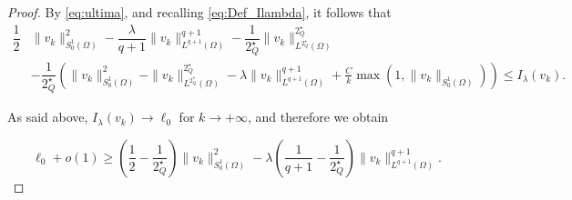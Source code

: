 \documentclass[11pt]{amsart}
\numberwithin{equation}{section} %
\theoremstyle{definition}
\newcommand{\m}{\mbox}
\begin{document}
\begin{proof}
\noindent By \eqref{eq:ultima}, and recalling \eqref{eq:Def_Ilambda}, it follows that
\begin{equation*}
	\begin{aligned}
	\dfrac{1}{2}&\| v_k\|^2_{{S_0^1(\Omega)}} - \dfrac{\lambda}{q+1}\|v_k\|^{q+1}_{L^{q+1}(\Omega)} - \dfrac{1}{2^\star_Q}\|v_k\|^{2^\star_Q}_{L^{2^\star_Q}(\Omega)} \\
	&-\dfrac{1}{2^{\star}_{Q}}\left(\| v_k\|^2_{{S_0^1(\Omega)}}-\|v_k\|^{2^\star_Q}_{L^{2^\star_Q}(\Omega)}-\lambda \|v_k\|^{q+1}_{L^{q+1}(\Omega)} +\frac{C}{k}\max(1,\|v_k\|_{{S_0^1(\Omega)}}) \right) \leq I_{\lambda}(v_k).
	\end{aligned}
\end{equation*}


\noindent As said above, $I_\lambda(v_k)\to \ell_0$ for $k\to+\infty$,
and therefore we obtain

\begin{equation}\label{eq:gamma0}
	\ell_0+o(1)\geq \left(\frac{1}{2}-\frac{1}{2^\star_Q}\right)\|v_k\|_{{S_0^1(\Omega)}}^2-\lambda\left(\frac{1}{q+1}-\frac{1}{2^\star_Q}\right)\|v_k\|_{L^{q+1}(\Omega)}^{q+1}.
\end{equation}



\end{proof}
\end{document}
